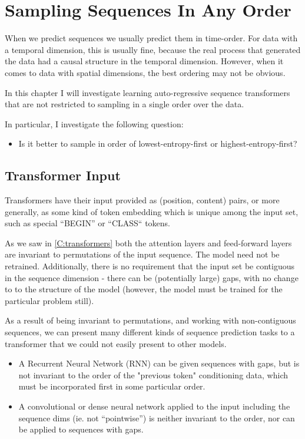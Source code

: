 \chapter{Sampling Sequences In Any Order}
\label{C:a-o-sampling}

When we predict sequences we usually predict them in time-order. For data with a temporal dimension, this is usually fine, because the real process that generated the data had a causal structure in the temporal dimension. However, when it comes to data with spatial dimensions, the best ordering may not be obvious.

In this chapter I will investigate learning auto-regressive sequence transformers that are not restricted to sampling in a single order over the data. 

In particular, I investigate the following question:

\begin{itemize}
    \item Is it better to sample in order of lowest-entropy-first or highest-entropy-first?
\end{itemize}

\section{Transformer Input}
\label{s:transformer-inputs}

Transformers have their input provided as (position, content) pairs, or more generally, as some kind of token embedding which is unique among the input set, such as special ``BEGIN'' or ``CLASS`` tokens.

As we saw in \cref{C:transformers} both the attention layers and feed-forward layers are invariant to permutations of the input sequence. The model need not be retrained. Additionally, there is no requirement that the input set be contiguous in the sequence dimension - there can be (potentially large) gaps, with no change to to the structure of the model (however, the model must be trained for the particular problem still).

As a result of being invariant to permutations, and working with non-contiguous sequences, we can present many different kinds of sequence prediction tasks to a transformer that we could not easily present to other models.

\begin{itemize}
    \item A Recurrent Neural Network (RNN) can be given sequences with gaps, but is not invariant to the order of the "previous token" conditioning data, which must be incorporated first in some particular order.
    \item A convolutional or dense neural network applied to the input including the sequence dims (ie. not ``pointwise'') is neither invariant to the order, nor can be applied to sequences with gaps.
\end{itemize}

